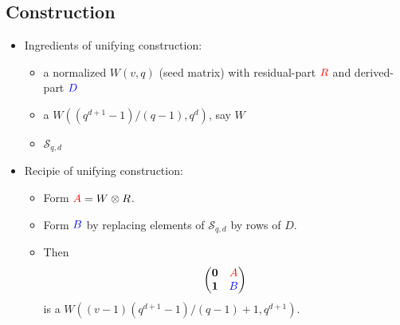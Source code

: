 \documentclass{beamer}
\newcommand{\rred}[1]{\textcolor{red}{#1}}
\newcommand{\bblue}[1]{\textcolor{blue}{#1}}
\begin{document}

\subsection{Construction}

\begin{frame}

  \begin{itemize}
  \item Ingredients of unifying construction:
    \begin{itemize} 
    \item a normalized $W(v,q)$ (seed matrix) with residual-part $\rred{R}$ and derived-part $\bblue{D}$
    \item a $W((q^{d+1}-1)/(q-1),q^d)$, say $W$
    \item $\mathcal{S}_{q,d}$
    \end{itemize}
  \end{itemize}
  
\end{frame}

\begin{frame}

  \begin{itemize}
  \item Recipie of unifying construction:
    \begin{itemize}
    \item Form $\rred{A} = W \otimes R$.
    \item Form $\bblue{B}$ by replacing elements of $\mathcal{S}_{q,d}$ by rows of $D$.
    \item Then
      \[
        \begin{pmatrix}
          \textbf{0} & \rred{A} \\
          \textbf{1} & \bblue{B}
        \end{pmatrix}
      \]
      is a $W((v-1)(q^{d+1}-1)/(q-1)+1,q^{d+1})$.
    \end{itemize}
  \end{itemize}
  
\end{frame}
\end{document}
